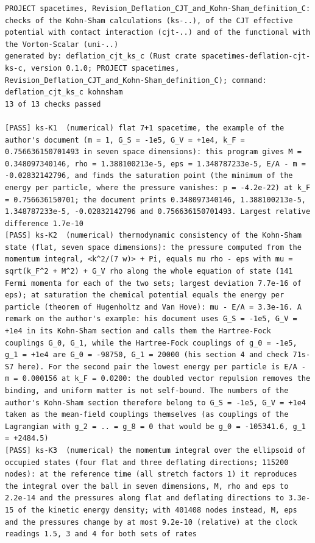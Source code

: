 \documentclass[
  10pt,
]{article}
\begin{document}
\begin{verbatim}
PROJECT spacetimes, Revision_Deflation_CJT_and_Kohn-Sham_definition_C: checks of the Kohn-Sham calculations (ks-..), of the CJT effective potential with contact interaction (cjt-..) and of the functional with the Vorton-Scalar (uni-..)
generated by: deflation_cjt_ks_c (Rust crate spacetimes-deflation-cjt-ks-c, version 0.1.0; PROJECT spacetimes, Revision_Deflation_CJT_and_Kohn-Sham_definition_C); command: deflation_cjt_ks_c kohnsham
13 of 13 checks passed

[PASS] ks-K1  (numerical) flat 7+1 spacetime, the example of the author's document (m = 1, G_S = -1e5, G_V = +1e4, k_F = 0.756636150701493 in seven space dimensions): this program gives M = 0.348097340146, rho = 1.388100213e-5, eps = 1.348787233e-5, E/A - m = -0.02832142796, and finds the saturation point (the minimum of the energy per particle, where the pressure vanishes: p = -4.2e-22) at k_F = 0.756636150701; the document prints 0.348097340146, 1.388100213e-5, 1.348787233e-5, -0.02832142796 and 0.756636150701493. Largest relative difference 1.7e-10
[PASS] ks-K2  (numerical) thermodynamic consistency of the Kohn-Sham state (flat, seven space dimensions): the pressure computed from the momentum integral, <k^2/(7 w)> + Pi, equals mu rho - eps with mu = sqrt(k_F^2 + M^2) + G_V rho along the whole equation of state (141 Fermi momenta for each of the two sets; largest deviation 7.7e-16 of eps); at saturation the chemical potential equals the energy per particle (theorem of Hugenholtz and Van Hove): mu - E/A = 3.3e-16. A remark on the author's example: his document uses G_S = -1e5, G_V = +1e4 in its Kohn-Sham section and calls them the Hartree-Fock couplings G_0, G_1, while the Hartree-Fock couplings of g_0 = -1e5, g_1 = +1e4 are G_0 = -98750, G_1 = 20000 (his section 4 and check 71s-S7 here). For the second pair the lowest energy per particle is E/A - m = 0.000156 at k_F = 0.0200: the doubled vector repulsion removes the binding, and uniform matter is not self-bound. The numbers of the author's Kohn-Sham section therefore belong to G_S = -1e5, G_V = +1e4 taken as the mean-field couplings themselves (as couplings of the Lagrangian with g_2 = .. = g_8 = 0 that would be g_0 = -105341.6, g_1 = +2484.5)
[PASS] ks-K3  (numerical) the momentum integral over the ellipsoid of occupied states (four flat and three deflating directions; 115200 nodes): at the reference time (all stretch factors 1) it reproduces the integral over the ball in seven dimensions, M, rho and eps to 2.2e-14 and the pressures along flat and deflating directions to 3.3e-15 of the kinetic energy density; with 401408 nodes instead, M, eps and the pressures change by at most 9.2e-10 (relative) at the clock readings 1.5, 3 and 4 for both sets of rates

\end{verbatim}
\end{document}
